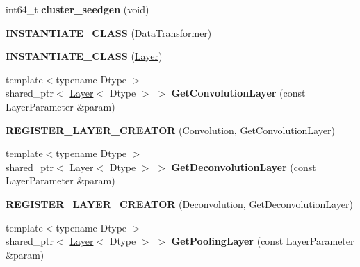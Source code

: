 \begin{DoxyCompactItemize}
\item 
int64\+\_\+t {\bfseries cluster\+\_\+seedgen} (void)\hypertarget{namespacecaffe_a50ff47a60ff1b1d917edd1254d770fbb}{}\label{namespacecaffe_a50ff47a60ff1b1d917edd1254d770fbb}

\item 
{\bfseries I\+N\+S\+T\+A\+N\+T\+I\+A\+T\+E\+\_\+\+C\+L\+A\+SS} (\hyperlink{classcaffe_1_1DataTransformer}{Data\+Transformer})\hypertarget{namespacecaffe_a5f53f0075544bd1a369e9bee585f0799}{}\label{namespacecaffe_a5f53f0075544bd1a369e9bee585f0799}

\item 
{\bfseries I\+N\+S\+T\+A\+N\+T\+I\+A\+T\+E\+\_\+\+C\+L\+A\+SS} (\hyperlink{classcaffe_1_1Layer}{Layer})\hypertarget{namespacecaffe_a651a9d87b2b5e2d398c2cfd802b0a4eb}{}\label{namespacecaffe_a651a9d87b2b5e2d398c2cfd802b0a4eb}

\item 
{\footnotesize template$<$typename Dtype $>$ }\\shared\+\_\+ptr$<$ \hyperlink{classcaffe_1_1Layer}{Layer}$<$ Dtype $>$ $>$ {\bfseries Get\+Convolution\+Layer} (const Layer\+Parameter \&param)\hypertarget{namespacecaffe_a259b2477b70134b1269e767ad3ddd254}{}\label{namespacecaffe_a259b2477b70134b1269e767ad3ddd254}

\item 
{\bfseries R\+E\+G\+I\+S\+T\+E\+R\+\_\+\+L\+A\+Y\+E\+R\+\_\+\+C\+R\+E\+A\+T\+OR} (Convolution, Get\+Convolution\+Layer)\hypertarget{namespacecaffe_a1f4ea6cace778c42c7c58da95ee35656}{}\label{namespacecaffe_a1f4ea6cace778c42c7c58da95ee35656}

\item 
{\footnotesize template$<$typename Dtype $>$ }\\shared\+\_\+ptr$<$ \hyperlink{classcaffe_1_1Layer}{Layer}$<$ Dtype $>$ $>$ {\bfseries Get\+Deconvolution\+Layer} (const Layer\+Parameter \&param)\hypertarget{namespacecaffe_a21c35989b74e0ca186bc19a2538b41e8}{}\label{namespacecaffe_a21c35989b74e0ca186bc19a2538b41e8}

\item 
{\bfseries R\+E\+G\+I\+S\+T\+E\+R\+\_\+\+L\+A\+Y\+E\+R\+\_\+\+C\+R\+E\+A\+T\+OR} (Deconvolution, Get\+Deconvolution\+Layer)\hypertarget{namespacecaffe_ae7650f179c7b3cdc8abb1b12efc18449}{}\label{namespacecaffe_ae7650f179c7b3cdc8abb1b12efc18449}

\item 
{\footnotesize template$<$typename Dtype $>$ }\\shared\+\_\+ptr$<$ \hyperlink{classcaffe_1_1Layer}{Layer}$<$ Dtype $>$ $>$ {\bfseries Get\+Pooling\+Layer} (const Layer\+Parameter \&param)\hypertarget{namespacecaffe_a16ad8636a8750c0d55e5d54550ec67cf}{}\label{namespacecaffe_a16ad8636a8750c0d55e5d54550ec67cf}


\end{DoxyCompactItemize}
